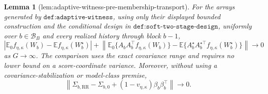 \documentclass{article}
\newtheorem{lemma}{Lemma}
\begin{document}
\begin{lemma}[lem:adaptive-witness-pre-membership-transport]\label{lem:adaptive-witness-pre-membership-transport}
For the arrays generated by \(\texttt{def:adaptive-witness}\), using only their displayed bounded construction and the conditional design in \(\texttt{def:soft-two-stage-design}\), uniformly over \(b\in\mathcal B_B\) and every realized history through block \(b-1\),
\[
 \left|\mathbb E_0f_{\eta,\kappa}(W_b)-\mathbb Ef_{\eta,\kappa}(W_b^\star)\right|
 +\left\|\mathbb E_0\{A_bA_b^\top f_{\eta,\kappa}(W_b)\}
 -\mathbb E\{A_b^\star A_b^{\star\top}f_{\eta,\kappa}(W_b^\star)\}\right\|
 \longrightarrow0
\]
as \(G\to\infty\).  The comparison uses the exact covariance range and requires no lower bound on a score-coordinate variance.  Moreover, without using a covariance-stabilization or model-class premise,
\[
 \left\|\Sigma_{b,\mathrm{RR}}-\Sigma_{b,0}
 +(1-v_{\eta,\kappa})\beta_b\beta_b^\top\right\|\longrightarrow0.
\]
\end{lemma}
\end{document}
